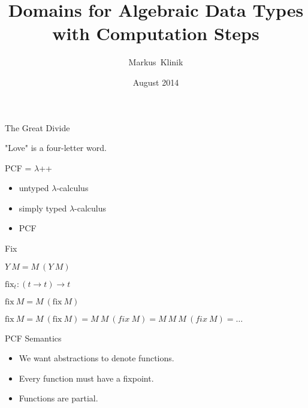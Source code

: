 \documentclass{beamer}
\title
{Domains for Algebraic Data Types with Computation Steps}
\author
{Markus~Klinik}
\institute[Radboud University Nijmegen]
{
  Radboud University Nijmegen
}
\date
{August 2014}
\newcommand{\fix}{\text{fix}}
\newcommand{\arr}{\rightarrow}
\begin{document}
\begin{frame}
  \titlepage
\end{frame}



\begin{frame}{The Great Divide}

"Love" is a four-letter word.

\end{frame}




\begin{frame}{PCF = $\lambda$++}


\begin{itemize}
\item untyped $\lambda$-calculus
\item simply typed $\lambda$-calculus
\item PCF
\end{itemize}




\end{frame}


\begin{frame}{Fix}


\begin{center}

\onslide<+->
$Y\ M = M\ (Y\ M)$
\vspace{1em}

\onslide<+->
$\fix_t : (t \arr t) \arr t$
\vspace{1em}

$\fix\ M = M\ (\fix\ M)$
\vspace{1em}

\onslide<+->

$\fix\ M = M\ (\fix\ M) = M\ M\ (fix\ M) = M\ M\ M\ (fix\ M) = \ldots$
\end{center}


\end{frame}



\begin{frame}{PCF Semantics}
\begin{itemize}
\item We want abstractions to denote functions.
\item Every function must have a fixpoint.
\item Functions are partial.
\end{itemize}
\end{frame}
\end{document}
